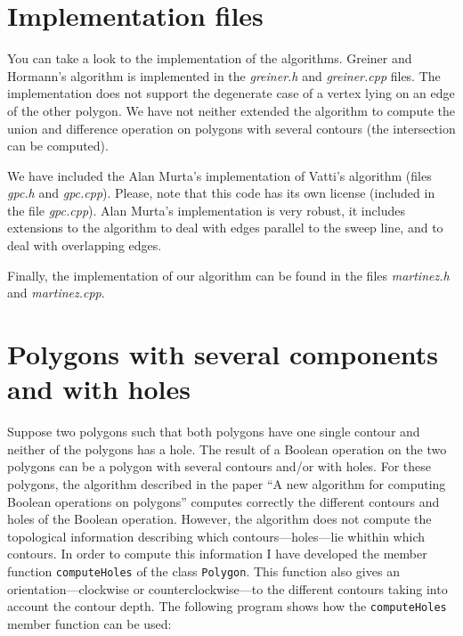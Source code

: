 \documentclass[a4paper]{article}
\begin{document}
%
%

\section{Implementation files}

You can take a look to the implementation of the algorithms. Greiner and Hormann's algorithm is implemented in the \textit{greiner.h} and \textit{greiner.cpp} files.
The implementation does not support the degenerate case of a vertex lying on an edge of the other polygon. We have not neither extended the algorithm
to compute the union and difference operation on polygons with several contours (the intersection can be computed).

We have included the Alan Murta's implementation of Vatti's algorithm (files \textit{gpc.h} and \textit{gpc.cpp}). Please, note that this code has its own
license (included in the file \textit{gpc.cpp}). Alan Murta's implementation is very robust, it includes extensions to the algorithm to deal with edges parallel to the sweep line, and to deal with overlapping edges.

Finally, the implementation of our algorithm can be found in the files \textit{martinez.h} and \textit{martinez.cpp}.

%
%

\section{Polygons with several components and with holes}

Suppose two polygons such that both polygons have one single contour and neither of the polygons has a hole. The result of a Boolean operation on the two polygons can be a polygon 
with several contours and/or with holes. For these polygons, the algorithm described in the paper ``A new algorithm for computing Boolean operations on polygons'' computes correctly
the different contours and holes of the Boolean operation. However, the algorithm does not compute the topological information describing which contours---holes---lie 
whithin which contours. In
order to compute this information I have developed the member function \lstinline+computeHoles+ of the class \lstinline+Polygon+. This function also gives an
orientation---clockwise or counterclockwise---to the different contours taking into account the contour depth. The following program shows how the 
\lstinline+computeHoles+ member function can be used:
\end{document}
